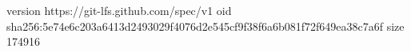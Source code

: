 version https://git-lfs.github.com/spec/v1
oid sha256:5e74e6c203a6413d2493029f4076d2e545cf9f38f6a6b081f72f649ea38c7a6f
size 174916
